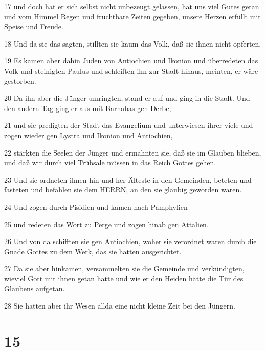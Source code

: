 \par 17 und doch hat er sich selbst nicht unbezeugt gelassen, hat uns viel Gutes getan und vom Himmel Regen und fruchtbare Zeiten gegeben, unsere Herzen erfüllt mit Speise und Freude.
\par 18 Und da sie das sagten, stillten sie kaum das Volk, daß sie ihnen nicht opferten.
\par 19 Es kamen aber dahin Juden von Antiochien und Ikonion und überredeten das Volk und steinigten Paulus und schleiften ihn zur Stadt hinaus, meinten, er wäre gestorben.
\par 20 Da ihn aber die Jünger umringten, stand er auf und ging in die Stadt. Und den andern Tag ging er aus mit Barnabas gen Derbe;
\par 21 und sie predigten der Stadt das Evangelium und unterwiesen ihrer viele und zogen wieder gen Lystra und Ikonion und Antiochien,
\par 22 stärkten die Seelen der Jünger und ermahnten sie, daß sie im Glauben blieben, und daß wir durch viel Trübsale müssen in das Reich Gottes gehen.
\par 23 Und sie ordneten ihnen hin und her Älteste in den Gemeinden, beteten und fasteten und befahlen sie dem HERRN, an den sie gläubig geworden waren.
\par 24 Und zogen durch Pisidien und kamen nach Pamphylien
\par 25 und redeten das Wort zu Perge und zogen hinab gen Attalien.
\par 26 Und von da schifften sie gen Antiochien, woher sie verordnet waren durch die Gnade Gottes zu dem Werk, das sie hatten ausgerichtet.
\par 27 Da sie aber hinkamen, versammelten sie die Gemeinde und verkündigten, wieviel Gott mit ihnen getan hatte und wie er den Heiden hätte die Tür des Glaubens aufgetan.
\par 28 Sie hatten aber ihr Wesen allda eine nicht kleine Zeit bei den Jüngern.

\chapter{15}

